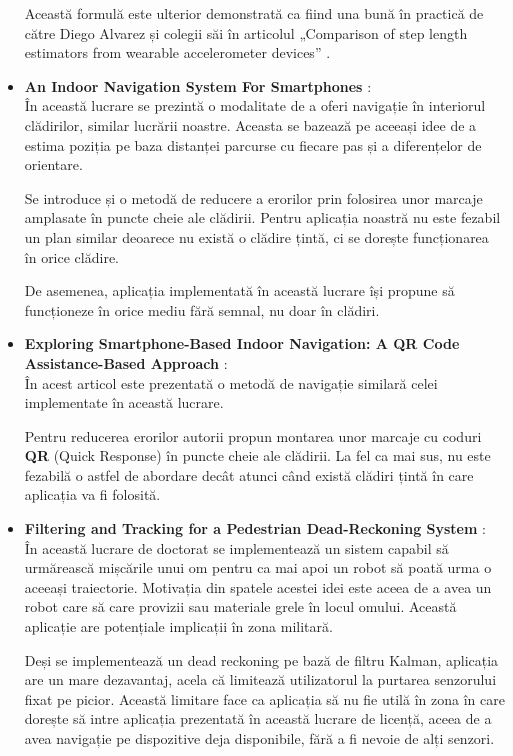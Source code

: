 \documentclass[12pt, a4paper, oneside]{article}
\begin{document}
\begin{itemize}
Această formulă este ulterior demonstrată ca fiind una bună în practică de către Diego Alvarez și colegii săi în articolul „Comparison of step length estimators from wearable accelerometer devices” \cite{StepLengthEstimatorsComparaison}.

\item \textbf{An Indoor Navigation System For Smartphones} \cite{AbhijitChandgadkar}:\\
În această lucrare se prezintă o modalitate de a oferi navigație în interiorul clădirilor, similar lucrării noastre. Aceasta se bazează pe aceeași idee de a estima poziția pe baza distanței parcurse cu fiecare pas și a diferențelor de orientare. 

Se introduce și o metodă de reducere a erorilor prin folosirea unor marcaje amplasate în puncte cheie ale clădirii. Pentru aplicația noastră nu este fezabil un plan similar deoarece nu există o clădire țintă, ci se dorește funcționarea în orice clădire.

De asemenea, aplicația implementată în această lucrare își propune să funcționeze în orice mediu fără semnal, nu doar în clădiri.

\item \textbf{Exploring Smartphone-Based Indoor Navigation: A QR Code Assistance-Based Approach} \cite{QRNavigation}:\\
În acest articol este prezentată o metodă de navigație similară celei implementate în această lucrare. 

Pentru reducerea erorilor autorii propun montarea unor marcaje cu coduri \textbf{QR} (Quick Response) în puncte cheie ale clădirii. La fel ca mai sus, nu este fezabilă o astfel de abordare decât atunci când există clădiri țintă în care aplicația va fi folosită.

\item \textbf{Filtering and Tracking for a Pedestrian Dead-Reckoning System} \cite{SuratKwanmuang}:\\
În această lucrare de doctorat se implementează un sistem capabil să urmărească mișcările unui om pentru ca mai apoi un robot să poată urma o aceeași traiectorie. Motivația din spatele acestei idei este aceea de a avea un robot care să care provizii sau materiale grele în locul omului. Această aplicație are potențiale implicații în zona militară.

Deși se implementează un dead reckoning pe bază de filtru Kalman, aplicația are un mare dezavantaj, acela că limitează utilizatorul la purtarea senzorului fixat pe picior. Această limitare face ca aplicația să nu fie utilă în zona în care dorește să intre aplicația prezentată în această lucrare de licență, aceea de a avea navigație pe dispozitive deja disponibile, fără a fi nevoie de alți senzori.


\end{itemize}
\end{document}
